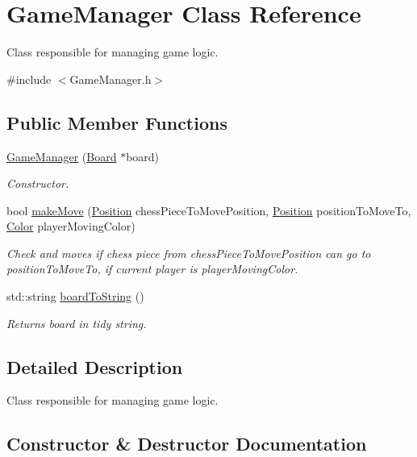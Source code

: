 \hypertarget{classGameManager}{}\section{Game\+Manager Class Reference}
\label{classGameManager}


Class responsible for managing game logic.  




{\ttfamily \#include $<$Game\+Manager.\+h$>$}

\subsection*{Public Member Functions}
\begin{DoxyCompactItemize}
\item 
\hyperlink{classGameManager_a79d810aa82d8987c1cdb0e67a7f361fb}{Game\+Manager} (\hyperlink{classBoard}{Board} $\ast$board)
\begin{DoxyCompactList}\small\item\em Constructor. \end{DoxyCompactList}\item 
bool \hyperlink{classGameManager_a115bc92a76d5a500667601ede0becb07}{make\+Move} (\hyperlink{classPosition}{Position} chess\+Piece\+To\+Move\+Position, \hyperlink{classPosition}{Position} position\+To\+Move\+To, \hyperlink{Enums_8h_ab87bacfdad76e61b9412d7124be44c1c}{Color} player\+Moving\+Color)
\begin{DoxyCompactList}\small\item\em Check and moves if chess piece from chess\+Piece\+To\+Move\+Position can go to position\+To\+Move\+To, if current player is player\+Moving\+Color. \end{DoxyCompactList}\item 
std\+::string \hyperlink{classGameManager_a882cb4b776ef8d0e6912c175d746fcdd}{board\+To\+String} ()
\begin{DoxyCompactList}\small\item\em Returns board in tidy string. \end{DoxyCompactList}\end{DoxyCompactItemize}


\subsection{Detailed Description}
Class responsible for managing game logic. 

\subsection{Constructor \& Destructor Documentation}
\mbox{\label{classGameManager_a79d810aa82d8987c1cdb0e67a7f361fb}} 
